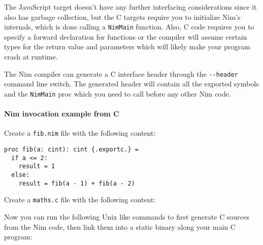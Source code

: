The JavaScript target doesn't have any further interfacing
considerations since it also has garbage collection, but the C targets
require you to initialize Nim's internals, which is done calling a
\texttt{NimMain} function. Also, C code requires you to specify a
forward declaration for functions or the compiler will assume certain
types for the return value and parameters which will likely make your
program crash at runtime.

The Nim compiler can generate a C interface header through the
\texttt{-\/-header} command line switch. The generated header will
contain all the exported symbols and the \texttt{NimMain} proc which you
need to call before any other Nim code.

\hypertarget{nim-invocation-example-from-c}{%
\paragraph{Nim invocation example from
C}\label{nim-invocation-example-from-c}}

Create a \texttt{fib.nim} file with the following content:

\begin{verbatim}
proc fib(a: cint): cint {.exportc.} =
  if a <= 2:
    result = 1
  else:
    result = fib(a - 1) + fib(a - 2)
\end{verbatim}

Create a \texttt{maths.c} file with the following content:

\begin{Shaded}
\begin{Highlighting}[]

\NormalTok{)}
\NormalTok{\{}
  \NormalTok{ (}
   \NormalTok{;}
\NormalTok{\}}
\end{Highlighting}
\end{Shaded}

Now you can run the following Unix like commands to first generate C
sources from the Nim code, then link them into a static binary along
your main C program:

